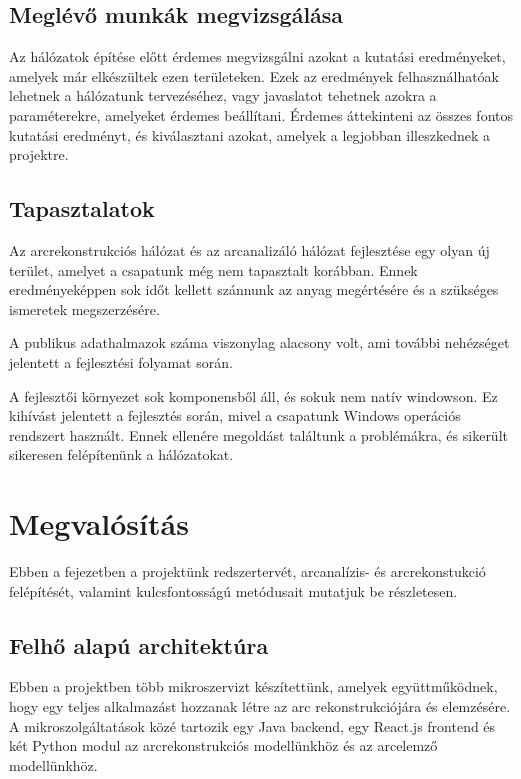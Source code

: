 \documentclass[12pt,a4]{article}
\begin{document}
        \subsection{Meglévő munkák megvizsgálása}

        Az hálózatok építése előtt érdemes megvizsgálni azokat a kutatási eredményeket, amelyek már elkészültek ezen területeken. Ezek az eredmények felhasználhatóak lehetnek a hálózatunk tervezéséhez, vagy javaslatot tehetnek azokra a paraméterekre, amelyeket érdemes beállítani. Érdemes áttekinteni az összes fontos kutatási eredményt, és kiválasztani azokat, amelyek a legjobban illeszkednek a projektre.
        
        \subsection{Tapasztalatok}

        Az arcrekonstrukciós hálózat és az arcanalizáló hálózat fejlesztése egy olyan új terület, amelyet a csapatunk még nem tapasztalt korábban. Ennek eredményeképpen sok időt kellett szánnunk az anyag megértésére és a szükséges ismeretek megszerzésére.

        A publikus adathalmazok száma viszonylag alacsony volt, ami további nehézséget jelentett a fejlesztési folyamat során.
        
        A fejlesztői környezet sok komponensből áll, és sokuk nem natív windowson. Ez kihívást jelentett a fejlesztés során, mivel a csapatunk Windows operációs rendszert használt. Ennek ellenére megoldást találtunk a problémákra, és sikerült sikeresen felépítenünk a hálózatokat.
    
    \section{Megvalósítás}
    
        Ebben a fejezetben a projektünk redszertervét, arcanalízis- és arcrekonstukció felépítését, valamint kulcsfontosságú metódusait mutatjuk be részletesen.
        
        \subsection{Felhő alapú architektúra}
        
            Ebben a projektben több mikroszervizt készítettünk, amelyek együttműködnek, hogy egy teljes alkalmazást hozzanak létre az arc rekonstrukciójára és elemzésére. A mikroszolgáltatások közé tartozik egy Java backend, egy React.js frontend és két Python modul az arcrekonstrukciós modellünkhöz és az arcelemző modellünkhöz.
\end{document}
